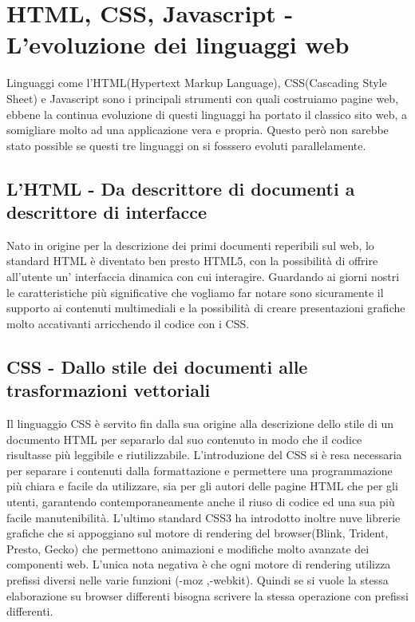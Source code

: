 
\chapter{HTML, CSS, Javascript - L'evoluzione dei linguaggi web} %

\label{ChapterX} %


Linguaggi come l'HTML(Hypertext Markup Language), CSS(Cascading Style Sheet) e Javascript sono i principali strumenti con quali costruiamo pagine web, ebbene la continua evoluzione di questi linguaggi ha portato il classico sito web, a somigliare molto ad una applicazione vera e propria. 
Questo però non sarebbe stato possible se  questi tre linguaggi on si fosssero evoluti parallelamente.
\section{L'HTML - Da descrittore di documenti a descrittore di interfacce}
Nato in origine per la descrizione dei primi documenti reperibili sul web, lo standard HTML è diventato ben presto HTML5, con la possibilità di offrire all'utente un' interfaccia dinamica con cui interagire.
Guardando ai giorni nostri le caratteristiche più significative che vogliamo far notare sono sicuramente il supporto ai contenuti multimediali e la possibilità di creare presentazioni grafiche molto accativanti
arricchendo il codice con i CSS.

\section{CSS - Dallo stile dei documenti alle trasformazioni vettoriali}
Il linguaggio CSS è servito fin dalla sua origine alla descrizione dello stile di un documento HTML per separarlo dal suo contenuto in modo che il codice risultasse più leggibile e riutilizzabile.
L’introduzione del CSS si è resa necessaria per separare i contenuti dalla formattazione e permettere una programmazione più chiara e facile da utilizzare, sia per gli autori delle pagine HTML che per gli utenti, garantendo contemporaneamente anche il riuso di codice ed una sua più facile manutenibilità.
L'ultimo standard CSS3 ha introdotto inoltre nuve librerie grafiche che si appoggiano sul motore di rendering del browser(Blink, Trident, Presto, Gecko) che permettono animazioni e modifiche molto avanzate dei componenti web.
L'unica nota negativa è che ogni motore di rendering utilizza prefissi diversi nelle varie funzioni (-moz ,-webkit). Quindi se si vuole la stessa elaborazione su browser differenti bisogna scrivere la stessa operazione con prefissi differenti.

